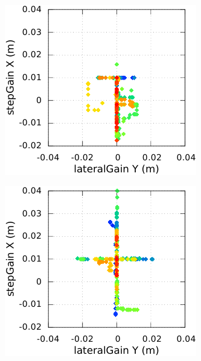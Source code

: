 \begin{figure}[htbp]
\begin{subfigure}{0.22\paperwidth}
    \end{subfigure}
    \begin{subfigure}{0.22\paperwidth}
        \centering
        \includegraphics[type=pdf,ext=.pdf,read=.pdf,width=1.0\linewidth]{../plot/OdometryLWPR/carpet_open_learn_log_walk_orders}
    \end{subfigure}
    \begin{subfigure}{0.22\paperwidth}
        \centering
        \includegraphics[type=pdf,ext=.pdf,read=.pdf,width=1.0\linewidth]{../plot/OdometryLWPR/carpet_close_learn_log_walk_orders}

\end{subfigure}
\end{figure}
